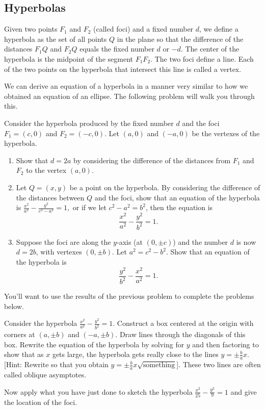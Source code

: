 \subsection{Hyperbolas}

\begin{definition}
Given two points $F_1$ and $F_2$ (called foci) and a fixed number $d$, we define a hyperbola as the set of all points $Q$ in the plane so that the difference of the distances $F_1Q$  and $F_2Q$ equals the fixed number $d$ or $-d$. The center of the hyperbola is the midpoint of the segment $F_1F_2$. The two foci define a line.  Each of the two points on the hyperbola that intersect this line is called a vertex.
\end{definition}

We can derive an equation of a hyperbola in a manner very similar to how we obtained an equation of an ellipse. The following problem will walk you through this.  

\begin{problem*}[Optional]
Consider the hyperbola produced by the fixed number $d$ and the foci $F_1=(c,0)$ and $F_2=(-c,0)$. Let $(a,0)$ and $(-a,0)$ be the vertexes of the hyperbola.
\begin{enumerate}
\item Show that $d=2a$ by considering the difference of the distances from $F_1$ and $F_2$ to the vertex $(a,0)$.
\item Let $Q=(x,y)$ be a point on the hyperbola. By considering the difference of the distances between $Q$ and the foci, show that an equation of the hyperbola is $\frac{x^2}{a^2}-\frac{y^2}{c^2-a^2}=1,$ or if we let $c^2-a^2=b^2$, then the equation is 
$$\frac{x^2}{a^2}-\frac{y^2}{b^2}=1.$$
\item Suppose the foci are along the $y$-axis (at $(0,\pm c)$) and the number $d$ is now $d=2b$, with vertexes $(0,\pm b)$. Let $a^2=c^2-b^2$. Show that an equation of the hyperbola is $$\frac{y^2}{b^2}-\frac{x^2}{a^2}=1.$$
\end{enumerate}
\end{problem*}

You'll want to use the results of the previous problem to complete the problems below.

\begin{problem} 
%
Consider the hyperbola $\frac{x^2}{a^2}-\frac{y^2}{b^2}=1.$ Construct a box centered at the origin with corners at $(a, \pm b)$ and $(-a,\pm b)$.  Draw lines through the diagonals of this box. Rewrite the equation of the hyperbola by solving for $y$ and then factoring to show that as $x$ gets large, the hyperbola gets really close to the lines $y=\pm \frac{b}{a}x$. [Hint: Rewrite so that you obtain $y=\pm\frac{b}{a}x\sqrt{\text{something}}$]. These two lines are often called oblique asymptotes. 

Now apply what you have just done to sketch the hyperbola $\frac{x^2}{25}-\frac{y^2}{9}=1$ and give the location of the foci. 
\end{problem}

